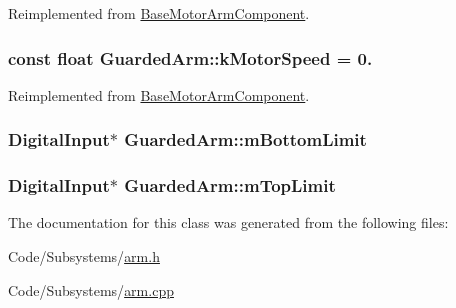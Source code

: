 \-Reimplemented from \hyperlink{class_base_motor_arm_component_a93cac72cee3f552037027ab847372f12}{\-Base\-Motor\-Arm\-Component}.

\hypertarget{class_guarded_arm_a4dd9a387e839ed3a965c721c9910b2da}{
\subsubsection[{k\-Motor\-Speed}]{\setlength{\rightskip}{0pt plus 5cm}const float {\bf \-Guarded\-Arm\-::k\-Motor\-Speed} = 0.}}\label{class_guarded_arm_a4dd9a387e839ed3a965c721c9910b2da}


\-Reimplemented from \hyperlink{class_base_motor_arm_component_ad8633011d5b9b10ca813a8504f38e74c}{\-Base\-Motor\-Arm\-Component}.

\hypertarget{class_guarded_arm_af6a8b2e72996d2e223507f15432185b4}{
\subsubsection[{m\-Bottom\-Limit}]{\setlength{\rightskip}{0pt plus 5cm}\-Digital\-Input$\ast$ {\bf \-Guarded\-Arm\-::m\-Bottom\-Limit}}}\label{class_guarded_arm_af6a8b2e72996d2e223507f15432185b4}
\hypertarget{class_guarded_arm_ab59585f354a04ff90c4065f2f3cff054}{
\subsubsection[{m\-Top\-Limit}]{\setlength{\rightskip}{0pt plus 5cm}\-Digital\-Input$\ast$ {\bf \-Guarded\-Arm\-::m\-Top\-Limit}}}\label{class_guarded_arm_ab59585f354a04ff90c4065f2f3cff054}


\-The documentation for this class was generated from the following files\-:\begin{DoxyCompactItemize}
\item 
\-Code/\-Subsystems/\hyperlink{arm_8h}{arm.\-h}\item 
\-Code/\-Subsystems/\hyperlink{arm_8cpp}{arm.\-cpp}\end{DoxyCompactItemize}
